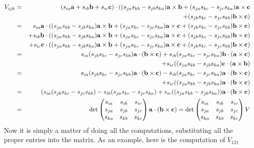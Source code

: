 \documentclass[12pt]{amsbook}
\begin{document}
\begin{eqnarray*}
V_{ijk}&=&(s_{ia}{\bf a}+s_{ib}{\bf b}+s_{ic}{\bf c})\cdot((s_{ja}s_{kb}-s_{jb}s_{ka}){\bf a}\times{\bf b}+(s_{ja}s_{kc}-s_{jc}s_{ka}){\bf a}\times{\bf c}\\
&&+(s_{jb}s_{kc}-s_{jc}s_{kb}){\bf b}\times{\bf c})\\
&=&s_{ia}{\bf a}\cdot((s_{ja}s_{kb}-s_{jb}s_{ka}){\bf a}\times{\bf b}+(s_{ja}s_{kc}-s_{jc}s_{ka}){\bf a}\times{\bf c}+(s_{jb}s_{kc}-s_{jc}s_{kb}){\bf b}\times{\bf c})\\
&&+s_{ib}{\bf b}\cdot((s_{ja}s_{kb}-s_{jb}s_{ka}){\bf a}\times{\bf b}+(s_{ja}s_{kc}-s_{jc}s_{ka}){\bf a}\times{\bf c}+(s_{jb}s_{kc}-s_{jc}s_{kb}){\bf b}\times{\bf c})\\
&&+s_{ic}{\bf c}\cdot((s_{ja}s_{kb}-s_{jb}s_{ka}){\bf a}\times{\bf b}+(s_{ja}s_{kc}-s_{jc}s_{ka}){\bf a}\times{\bf c}+(s_{jb}s_{kc}-s_{jc}s_{kb}){\bf b}\times{\bf c})\\
&=&s_{ia}(s_{jb}s_{kc}-s_{jc}s_{kb}){\bf a}\cdot({\bf b}\times{\bf c})+s_{ib}(s_{ja}s_{kc}-s_{jc}s_{ka}){\bf b}\cdot({\bf a}\times{\bf c})\\
&&+s_{ic}((s_{ja}s_{kb}-s_{jb}s_{ka}){\bf c}\cdot({\bf a}\times{\bf b})\\
&=&s_{ia}(s_{jb}s_{kc}-s_{jc}s_{kb}){\bf a}\cdot({\bf b}\times{\bf c})-s_{ib}(s_{ja}s_{kc}-s_{jc}s_{ka}){\bf a}\cdot({\bf b}\times{\bf c})\\
&&+s_{ic}((s_{ja}s_{kb}-s_{jb}s_{ka}){\bf a}\cdot({\bf b}\times{\bf c})\\
&=&(s_{ia}(s_{jb}s_{kc}-s_{jc}s_{kb})-s_{ib}(s_{ja}s_{kc}-s_{jc}s_{ka})+s_{ic}((s_{ja}s_{kb}-s_{jb}s_{ka})){\bf a}\cdot({\bf b}\times{\bf c})\\
&=&\det\begin{pmatrix} s_{ia} & s_{ib} & s_{ic} \\ s_{ja} & s_{jb} & s_{jc} \\ s_{ka} & s_{kb} & s_{kc} \\ 
\end{pmatrix}{\bf a}\cdot({\bf b}\times{\bf c})=\det\begin{pmatrix} s_{ia} & s_{ib} & s_{ic} \\ s_{ja} & s_{jb} & s_{jc} \\ s_{ka} & s_{kb} & s_{kc} \\ 
\end{pmatrix}V
\end{eqnarray*}
Now it is simply a matter of doing all the computations, substituting all the proper entries into the matrix. As an example, here is the computation of $V_{121}$
\end{document}
